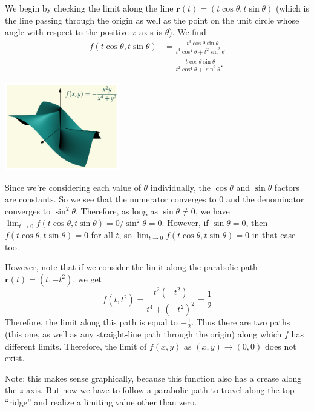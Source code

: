 \documentclass[svgnames]{watsonbook}
\begin{document}
\begin{solution}
  \begin{minipage}{0.7\textwidth}
    We begin by checking the limit along the line $\mathbf{r}(t) = (t\cos
    \theta, t \sin \theta)$ (which is the line passing through the
    origin as well as the point on the unit circle whose angle with
    respect to the positive $x$-axis is $\theta$). We find
    \begin{align*}
      f(t\cos\theta, t \sin \theta) &= \frac{-t^3
                                      \cos\theta \sin \theta}{t^4 \cos^4 \theta + t^2 \sin^2 \theta} \\
                                    &= \frac{-t \cos\theta \sin \theta}{t^2 \cos^4 \theta + \sin^2
                                      \theta}. 
    \end{align*}
  \end{minipage}
  \begin{minipage}{0.29\textwidth}
  \includegraphics[width=5cm]{figures/limitparab}
\end{minipage}
Since we're considering each value of $\theta$ individually, the
  $\cos \theta$ and $\sin \theta$ factors are constants. So we see that the
  numerator converges to $0$ and the denominator converges to
  $\sin^2\theta$. Therefore, as long as $\sin \theta \neq 0$, we have
  $\lim_{t\to 0}f(t\cos\theta, t \sin \theta) = 0/\sin^2\theta =
  0$. However, if $\sin \theta = 0$, then
  $f(t\cos\theta, t \sin \theta) = 0$ for all $t$, so
  $\lim_{t\to 0}f(t\cos\theta, t \sin \theta) = 0$ in that case too.
  
  However, note that if we consider the limit along the parabolic
  path $\mathbf{r}(t) = (t, -t^2)$, we get
  \[
    f(t,t^2) = \frac{t^2(-t^2)}{t^4+(-t^2)^2} = \frac{1}{2}
  \]
  Therefore, the limit along this path is equal to
  $-\tfrac{1}{2}$. Thus there are two paths (this one, as well as
  any straight-line path through the origin) along which $f$ has
  different limits. Therefore, the limit of $f(x,y)$ as $(x,y) \to
  (0,0)$ does not exist.
  
  Note: this makes sense graphically, because this function also has a
  crease along the $z$-axis. But now we have to follow a
  parabolic path to travel along the top ``ridge'' and realize a
  limiting value other than zero.
\end{solution}
\end{document}
